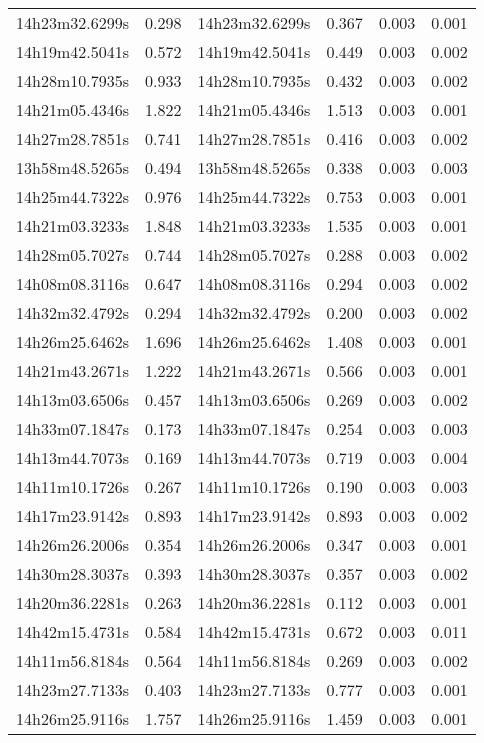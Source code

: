 \begin{table}
\begin{tabular}{cccccc}
14h23m32.6299s & 0.298 & 14h23m32.6299s & 0.367 & 0.003 & 0.001 \\
14h19m42.5041s & 0.572 & 14h19m42.5041s & 0.449 & 0.003 & 0.002 \\
14h28m10.7935s & 0.933 & 14h28m10.7935s & 0.432 & 0.003 & 0.002 \\
14h21m05.4346s & 1.822 & 14h21m05.4346s & 1.513 & 0.003 & 0.001 \\
14h27m28.7851s & 0.741 & 14h27m28.7851s & 0.416 & 0.003 & 0.002 \\
13h58m48.5265s & 0.494 & 13h58m48.5265s & 0.338 & 0.003 & 0.003 \\
14h25m44.7322s & 0.976 & 14h25m44.7322s & 0.753 & 0.003 & 0.001 \\
14h21m03.3233s & 1.848 & 14h21m03.3233s & 1.535 & 0.003 & 0.001 \\
14h28m05.7027s & 0.744 & 14h28m05.7027s & 0.288 & 0.003 & 0.002 \\
14h08m08.3116s & 0.647 & 14h08m08.3116s & 0.294 & 0.003 & 0.002 \\
14h32m32.4792s & 0.294 & 14h32m32.4792s & 0.200 & 0.003 & 0.002 \\
14h26m25.6462s & 1.696 & 14h26m25.6462s & 1.408 & 0.003 & 0.001 \\
14h21m43.2671s & 1.222 & 14h21m43.2671s & 0.566 & 0.003 & 0.001 \\
14h13m03.6506s & 0.457 & 14h13m03.6506s & 0.269 & 0.003 & 0.002 \\
14h33m07.1847s & 0.173 & 14h33m07.1847s & 0.254 & 0.003 & 0.003 \\
14h13m44.7073s & 0.169 & 14h13m44.7073s & 0.719 & 0.003 & 0.004 \\
14h11m10.1726s & 0.267 & 14h11m10.1726s & 0.190 & 0.003 & 0.003 \\
14h17m23.9142s & 0.893 & 14h17m23.9142s & 0.893 & 0.003 & 0.002 \\
14h26m26.2006s & 0.354 & 14h26m26.2006s & 0.347 & 0.003 & 0.001 \\
14h30m28.3037s & 0.393 & 14h30m28.3037s & 0.357 & 0.003 & 0.002 \\
14h20m36.2281s & 0.263 & 14h20m36.2281s & 0.112 & 0.003 & 0.001 \\
14h42m15.4731s & 0.584 & 14h42m15.4731s & 0.672 & 0.003 & 0.011 \\
14h11m56.8184s & 0.564 & 14h11m56.8184s & 0.269 & 0.003 & 0.002 \\
14h23m27.7133s & 0.403 & 14h23m27.7133s & 0.777 & 0.003 & 0.001 \\
14h26m25.9116s & 1.757 & 14h26m25.9116s & 1.459 & 0.003 & 0.001 \\

\end{tabular}
\end{table}
